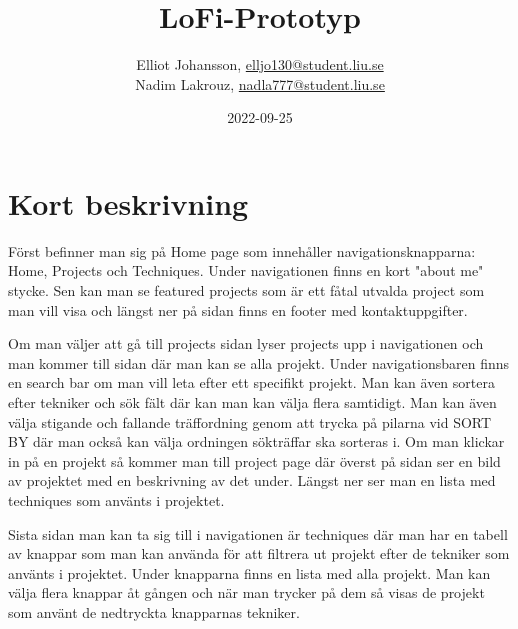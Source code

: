\documentclass{TDP003mall}
\author{Elliot Johansson, \url{elljo130@student.liu.se}\\
  Nadim Lakrouz, \url{nadla777@student.liu.se}}
\title{LoFi-Prototyp}
\date{2022-09-25}
\begin{document}
\projectpage


\section{Kort beskrivning}

Först befinner man sig på Home page som innehåller navigationsknapparna: Home, Projects och Techniques. Under navigationen finns en kort "about me" stycke. Sen kan man se featured projects som är ett fåtal utvalda project som man vill visa och längst ner på sidan finns en footer med kontaktuppgifter.

Om man väljer att gå till projects sidan lyser projects upp i navigationen och man kommer till sidan där man kan se alla projekt. Under navigationsbaren finns en search bar om man vill leta efter ett specifikt projekt. Man kan även sortera efter tekniker och sök fält där kan man kan välja flera samtidigt. Man kan även välja stigande och fallande träffordning genom att trycka på pilarna vid  SORT BY  där man också kan välja ordningen sökträffar ska sorteras i. Om man klickar in på en projekt så kommer man till
project page där överst på sidan ser en bild av projektet med en beskrivning av det under. Längst ner ser man en lista med techniques som använts i projektet.

Sista sidan man kan ta sig till i navigationen är techniques där man har en tabell av knappar som man kan använda för att filtrera ut projekt efter de tekniker som använts i projektet. Under knapparna finns en lista med alla projekt. Man kan välja flera knappar åt gången och när man trycker på dem så visas de projekt som använt de nedtryckta knapparnas tekniker.
\end{document}
